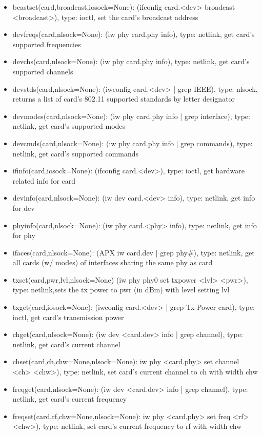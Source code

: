\documentclass[11pt]{article}
\begin{document}
\begin{appendices}
\begin{itemize}
\item bcastset(card,broadcast,iosock=None): (ifconfig card.<dev> broadcast 
<broadcast>), type: ioctl, set the card's broadcast address
\item devfreqs(card,nlsock=None): (iw phy card.phy info), type: netlink, get card's 
supported frequencies
\item devchs(card,nlsock=None): (iw phy card.phy info), type: netlink, get card's 
supported channels
\item devstds(card,nlsock=None): (iwconfig card.<dev> | grep IEEE), type: nlsock, 
returns a list of card's 802.11 supported standards by letter designator
\item devmodes(card,nlsock=None): (iw phy card.phy info | grep interface), type:
netlink, get card's supported modes
\item devcmds(card,nlsock=None): (iw phy card.phy info | grep commands), type:
netlink, get card's supported commands
\item ifinfo(card,iosock=None): (ifconfig card.<dev>), type: ioctl, get hardware 
related info for card 
\item devinfo(card,nlsock=None): (iw dev card.<dev> info), type: netlink, get info 
for dev 
\item phyinfo(card,nlsock=None): (iw phy card.<phy> info), type: netlink, get info
for phy
\item ifaces(card,nlsock=None): (APX iw card.dev | grep phy\#), type: netlink, get all
cards (w/ modes) of interfaces sharing the same phy as card
\item txset(card,pwr,lvl,nlsock=None) (iw phy phy0 set txpower <lvl> <pwr>), type: 
netlink,sets the tx power to pwr (in dBm) with level setting lvl 
\item txget(card,iosock=None): (iwconfig card.<dev> | grep Tx-Power card), type: 
ioctl, get card's transmission power
\item chget(card,nlsock=None): (iw dev <card.dev> info | grep channel), type: 
netlink, get card's current channel 
\item chset(card,ch,chw=None,nlsock=None): iw phy <card.phy> set channel <ch> <chw>), 
type: netlink, set card's current channel to ch with width chw
\item freqget(card,nlsock=None): (iw dev <card.dev> info | grep channel), type: 
netlink, get card's current frequency
\item freqset(card,rf,chw=None,nlsock=None): iw phy <card.phy> set freq <rf> <chw>), 
type: netlink, set card's current frequency to rf with width chw

\end{itemize}
\end{appendices}
\end{document}

